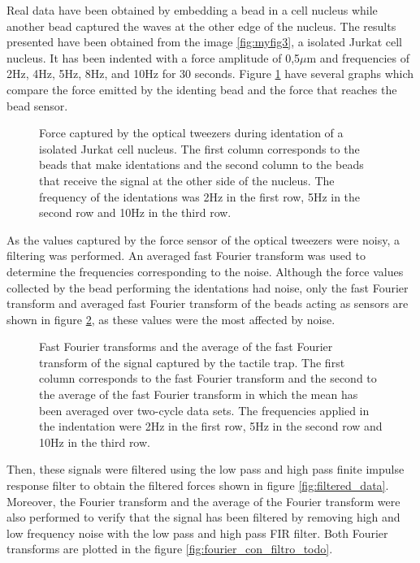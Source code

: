 \documentclass[12pt, a4paper]{article} %
\begin{document}
Real data have been obtained by embedding a bead in a cell nucleus while another bead captured the waves at the other edge of the nucleus. The results presented have been obtained from the image \ref{fig:myfig3}, a isolated Jurkat cell nucleus. It has been indented with a force amplitude of 0,5$\mu$m and frequencies of 2Hz, 4Hz, 5Hz, 8Hz, and 10Hz for 30 seconds. Figure \ref{fig:raw_data} have several graphs which compare the force emitted by the identing bead and the force that reaches the bead sensor. \\

\setlength{\parskip}{4mm}

\begin{figure}[htbp]
  \centering
  
  \caption{Force captured by the optical tweezers during identation of a isolated Jurkat cell nucleus. The first column corresponds to the beads that make identations and the second column to the beads that receive the signal at the other side of the nucleus. The frequency of the identations was 2Hz in the first row, 5Hz in the second row and 10Hz in the third row.}
  \label{fig:raw_data}
\end{figure}

As the values captured by the force sensor of the optical tweezers were noisy, a filtering was performed. An averaged fast Fourier transform was used to determine the frequencies corresponding to the noise. Although the force values collected by the bead performing the identations had noise, only the fast Fourier transform and averaged fast Fourier transform of the beads acting as sensors are shown in figure \ref{fig:fourier_sin_filtro}, as these values were the most affected by noise. 

\newpage

\begin{figure}[htbp]
  \centering
  
  \caption{Fast Fourier transforms and the average of the fast Fourier transform of the signal captured by the tactile trap. The first column corresponds to the fast Fourier transform and the second to the average of the fast Fourier transform in which the mean has been averaged over two-cycle data sets. The frequencies applied in the indentation were 2Hz in the first row, 5Hz in the second row and 10Hz in the third row.}
  \label{fig:fourier_sin_filtro}
\end{figure}

Then, these signals were filtered using the low pass and high pass finite impulse response filter to obtain the filtered forces shown in figure \ref{fig:filtered_data}. Moreover, the Fourier transform and the average of the Fourier transform were also performed to verify that the signal has been filtered by removing high and low frequency noise with the low pass and high pass FIR filter. Both Fourier transforms are plotted in the figure \ref{fig:fourier_con_filtro_todo}.
\end{document}
